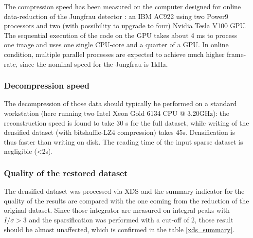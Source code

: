 \documentclass[preprint]{iucr}              %
\begin{document}

The compression speed has been measured on the computer designed for online data-reduction of the Jungfrau detector \cite{sri2021}: 
an IBM AC922 using two Power9 processors and two (with possibility to upgrade to four) Nvidia Tesla V100 GPU. 
The sequential execution of the code on the GPU takes about 4 ms to process one image and uses one single CPU-core and a quarter of a GPU. 
In online condition, multiple parallel processes are expected to achieve much higher frame-rate, since the nominal speed for the Jungfrau is 1kHz.

\subsubsection{Decompression speed} 
The decompression of those data should typically be performed on a standard workstation (here running two Intel Xeon Gold 6134 CPU @ 3.20GHz): the reconstruction speed is found to take 30 s for the full dataset, while writing of the densified dataset (with bitshuffle-LZ4 compression) takes 45s. 
Densification is thus faster than writing on disk.
The reading time of the input sparse dataset is negligible (<2s).

\subsubsection{Quality of the restored dataset} 
The densified dataset was processed via XDS and the summary indicator for the quality of the results are compared with the one coming from the reduction of the original dataset. 
Since those integrator are measured on integral peaks with $I/\sigma>3$ and the sparsification was performed
with a cut-off of 2, those result should be almost unaffected, which is confirmed in the table \ref{xds_summary}.
\end{document}

